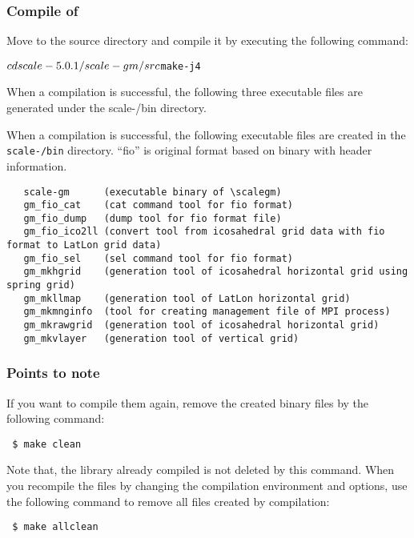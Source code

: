 \subsubsection{Compile of \scalegm} %

Move to the \scalegm source directory
and compile it by executing the following command:
\begin{alltt}
  $  cd scale-{\version}/scale-gm/src
  $  make -j 4
\end{alltt}

When a compilation is successful,
the following three executable files are generated under the scale-{\version}/bin directory.

When a compilation is successful,
the following executable files are created in the \texttt{scale-{\version}/bin} directory.
``fio'' is original format based on binary with header information.
\begin{verbatim}
   scale-gm      (executable binary of \scalegm)
   gm_fio_cat    (cat command tool for fio format)
   gm_fio_dump   (dump tool for fio format file)
   gm_fio_ico2ll (convert tool from icosahedral grid data with fio format to LatLon grid data)
   gm_fio_sel    (sel command tool for fio format)
   gm_mkhgrid    (generation tool of icosahedral horizontal grid using spring grid)
   gm_mkllmap    (generation tool of LatLon horizontal grid)
   gm_mkmnginfo  (tool for creating management file of MPI process)
   gm_mkrawgrid  (generation tool of icosahedral horizontal grid)
   gm_mkvlayer   (generation tool of vertical grid)
\end{verbatim}


\subsubsection{Points to note}

\noindent If you want to compile them again, remove the created binary files by the following command:
\begin{verbatim}
 $ make clean
\end{verbatim}
Note that, the library already compiled is not deleted by this command.
When you recompile the files by changing the compilation environment and options, use the following command to remove all files created by compilation:
\begin{verbatim}
 $ make allclean
\end{verbatim}


